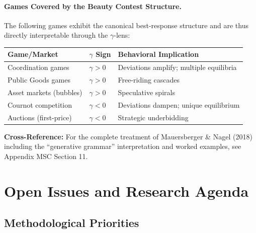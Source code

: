\paragraph{Games Covered by the Beauty Contest Structure.}
The following games exhibit the canonical best-response structure and are thus
directly interpretable through the $\gamma$-lens:

\begin{center}
\renewcommand{\arraystretch}{1.2}
\begin{tabular}{@{}p{4.5cm}p{3cm}p{5cm}@{}}
\toprule
\textbf{Game/Market} & \textbf{$\gamma$ Sign} & \textbf{Behavioral Implication} \\
\midrule
Coordination games & $\gamma > 0$ & Deviations amplify; multiple equilibria \\
Public Goods games & $\gamma > 0$ & Free-riding cascades \\
Asset markets (bubbles) & $\gamma > 0$ & Speculative spirals \\
Cournot competition & $\gamma < 0$ & Deviations dampen; unique equilibrium \\
Auctions (first-price) & $\gamma < 0$ & Strategic underbidding \\
\bottomrule
\end{tabular}
\end{center}

\textbf{Cross-Reference:} For the complete treatment of Mauersberger \& Nagel (2018)
including the ``generative grammar'' interpretation and worked examples, see
Appendix MSC Section 11.


\section{Open Issues and Research Agenda}
\label{sec:B-open-issues}

\subsection{Methodological Priorities}

